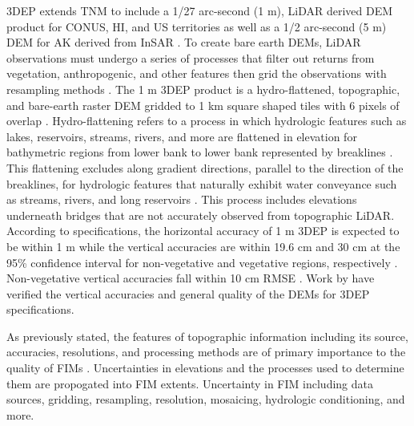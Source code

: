\documentclass[preprint,review,12pt]{dependencies/elsarticle}
\begin{document}
\ac{3DEP} extends \ac{TNM} to include a 1/27 arc-second (1 \ac{m}), \ac{LiDAR} derived \ac{DEM} product for \ac{CONUS}, \ac{HI}, and \ac{US} territories as well as a 1/2 arc-second (5 \ac{m}) \ac{DEM} for \ac{AK} derived from \ac{InSAR} \citep{sugarbaker20143d,stoker2015usgs}.
To create bare earth \acp{DEM}, \ac{LiDAR} observations must undergo a series of processes that filter out returns from vegetation, anthropogenic, and other features then grid the observations with resampling methods \citep{passalacqua2015analyzing}.
The 1 \ac{m} \ac{3DEP} product is a \ac{hydro-flattened}, topographic, and bare-earth raster \ac{DEM} gridded to 1 \ac{km} square shaped tiles with 6 pixels of overlap \citep{arundel20151}.
Hydro-flattening refers to a process in which hydrologic features such as lakes, reservoirs, streams, rivers, and more are flattened in elevation for bathymetric regions from lower bank to lower bank represented by breaklines \citep{archuleta2017national,maune2018digital}.
This flattening excludes along gradient directions, parallel to the direction of the breaklines, for hydrologic features that naturally exhibit water conveyance such as streams, rivers, and long reservoirs \citep{arundel20151}.
This process includes elevations underneath bridges that are not accurately observed from topographic \ac{LiDAR}.
According to specifications, the horizontal accuracy of 1 \ac{m} \ac{3DEP} is expected to be within 1 \ac{m} while the vertical accuracies are within 19.6 \ac{cm} and 30 \ac{cm} at the 95\% confidence interval for non-vegetative and vegetative regions, respectively \citep{arundel20151,heidemann2018lidar}.
Non-vegetative vertical accuracies fall within 10 \ac{cm} \ac{RMSE} \citep{arundel20151,heidemann2018lidar}.
 Work by \citet{stoker2022accuracy,callahan2022vertical,kim2022absolute} have verified the vertical accuracies and general quality of the \acp{DEM} for \ac{3DEP} specifications.

As previously stated, the features of topographic information including its source, accuracies, resolutions, and processing methods are of primary importance to the quality of \acp{FIM} \citep{national2007elevation,national2009mapping,carswell20183d,bales2009sources}.
Uncertainties in elevations and the processes used to determine them are propogated into \ac{FIM} extents.
Uncertainty in FIM \citep{merwade2008uncertainty} including data sources, gridding, resampling, resolution, mosaicing, hydrologic conditioning, and more. 
\end{document}
